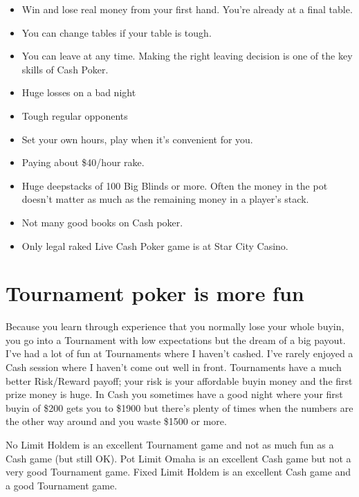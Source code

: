 \begin{itemize}
  \item Win and lose real money from your first hand. You're already
    at a final table.
  \item You can change tables if your table is tough.
  \item You can leave at any time. Making the right leaving decision
    is one of the key skills of Cash Poker.
  \item Huge losses on a bad night
  \item Tough regular opponents
  \item Set your own hours, play when it's convenient for you.
  \item Paying about \$40/hour rake.
  \item Huge deepstacks of 100 Big Blinds or more. Often the money in
    the pot doesn't matter as much as the remaining money in a
    player's stack.
  \item Not many good books on Cash poker.
  \item Only legal raked Live Cash Poker game is at Star City Casino.
\end{itemize}

\section{Tournament poker is more fun}

Because you learn through experience that you normally lose your whole
buyin, you go into a Tournament with low expectations but the dream of
a big payout. I've had a lot of fun at Tournaments where I haven't
cashed. I've rarely enjoyed a Cash session where I haven't come out
well in front. Tournaments have a much better Risk/Reward payoff; your
risk is your affordable buyin money and the first prize money is
huge. In Cash you sometimes have a good night where your first buyin
of \$200 gets you to \$1900 but there's plenty of times when the
numbers are the other way around and you waste \$1500 or more.

No Limit Holdem is an excellent Tournament game and not as much fun as
a Cash game (but still OK). Pot Limit Omaha is an excellent Cash game
but not a very good Tournament game. Fixed Limit Holdem is an
excellent Cash game and a good Tournament game.
